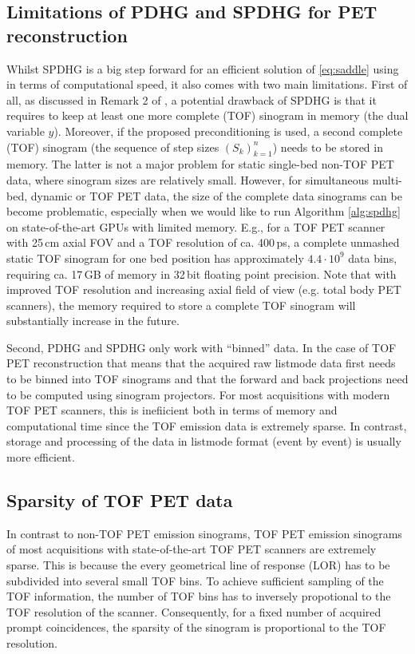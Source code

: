 \subsection*{Limitations of PDHG and SPDHG for PET reconstruction}

Whilst SPDHG is a big step forward for an efficient solution of \eqref{eq:saddle} using
in terms of computational speed, it also comes with two main limitations.
First of all, as discussed in Remark 2 of \cite{Ehrhardt2019}, 
a potential drawback of SPDHG is that it requires to keep at least one more complete 
(TOF) sinogram in memory (the dual variable $y$). 
Moreover, if the proposed preconditioning is used, a second complete (TOF) sinogram
(the sequence of step sizes $(S_k)_{k=1}^n$) needs to be stored in memory.
The latter is not a major problem for static single-bed non-TOF PET data, where sinogram sizes
are relatively small.
However, for simultaneous multi-bed, dynamic or TOF PET data, the size of the complete data sinograms
can be become problematic, especially when we would like to run Algorithm \ref{alg:spdhg} on
state-of-the-art GPUs with limited memory.
E.g., for a TOF PET scanner with 25\,cm axial FOV and a TOF resolution of ca. 400\,ps, 
a complete unmashed static TOF sinogram for one bed position 
has approximately $4.4\cdot10^9$ data bins, requiring ca. 17\,GB of memory in 32\,bit floating
point precision.
Note that with improved TOF resolution and increasing axial field of view (e.g. total body 
PET scanners), the memory required to store a complete TOF sinogram will substantially increase
in the future.

Second, PDHG and SPDHG only work with ``binned'' data.
In the case of TOF PET reconstruction that means that the acquired raw listmode data first needs to be
binned into TOF sinograms and that the forward and back projections need to be computed using
sinogram projectors.
For most acquisitions with modern TOF PET scanners, this is inefiicient both in terms of memory and
computational time since the TOF emission data is extremely sparse.
In contrast, storage and processing of the data in listmode format (event by event) is usually 
more efficient.

\subsection*{Sparsity of TOF PET data}

In contrast to non-TOF PET emission sinograms, TOF PET emission sinograms of most acquisitions
with state-of-the-art TOF PET scanners are extremely sparse.
This is because the every geometrical line of response (LOR) has to be subdivided into
several small TOF bins.
To achieve sufficient sampling of the TOF information, the number of TOF bins has to
inversely propotional to the TOF resolution of the scanner. 
Consequently, for a fixed number of acquired prompt coincidences, the sparsity of the
sinogram is proportional to the TOF resolution.


